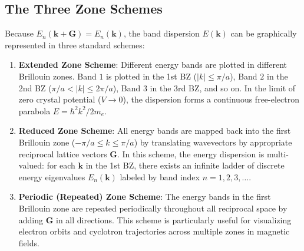 \documentclass[11pt,a4paper]{article}
\newcommand{\vb}[1]{\mathbf{#1}}
\begin{document}
\subsection{The Three Zone Schemes}
Because $E_n(\vb{k} + \vb{G}) = E_n(\vb{k})$, the band dispersion $E(\vb{k})$ can be graphically represented in three standard schemes:
\begin{enumerate}[leftmargin=*]
    \item \textbf{Extended Zone Scheme}: Different energy bands are plotted in different Brillouin zones. Band $1$ is plotted in the 1st BZ ($|k| \le \pi/a$), Band $2$ in the 2nd BZ ($\pi/a < |k| \le 2\pi/a$), Band $3$ in the 3rd BZ, and so on. In the limit of zero crystal potential ($V \to 0$), the dispersion forms a continuous free-electron parabola $E = \hbar^2 k^2 / 2m_e$.
    \item \textbf{Reduced Zone Scheme}: All energy bands are mapped back into the first Brillouin zone ($-\pi/a \le k \le \pi/a$) by translating wavevectors by appropriate reciprocal lattice vectors $\vb{G}$. In this scheme, the energy dispersion is multi-valued: for each $\vb{k}$ in the 1st BZ, there exists an infinite ladder of discrete energy eigenvalues $E_n(\vb{k})$ labeled by band index $n = 1, 2, 3, \dots$.
    \item \textbf{Periodic (Repeated) Zone Scheme}: The energy bands in the first Brillouin zone are repeated periodically throughout all reciprocal space by adding $\vb{G}$ in all directions. This scheme is particularly useful for visualizing electron orbits and cyclotron trajectories across multiple zones in magnetic fields.
\end{enumerate}
\end{document}
